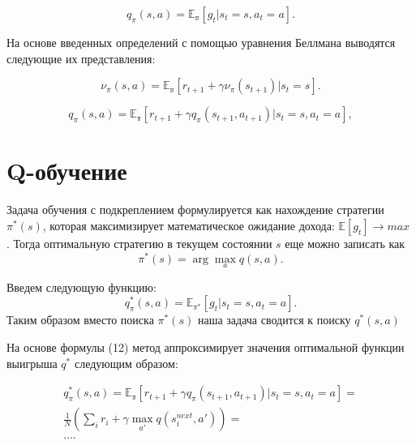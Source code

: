 \begin{equation}
    q_{\pi} (s, a)= \mathbb{E_{\pi}} [g_t | s_t = s, a_t = a].
\end{equation}

На основе введенных определений с помощью уравнения Беллмана выводятся следующие их представления:


\begin{equation}
	\nu_{\pi}(s, a) = \mathbb{E_\pi} [ r_{t+1} + \gamma \nu_\pi(s_{t+1}) | s_t=s].
\end{equation}

\begin{equation}
    q_{\pi}(s, a) = \mathbb{E_\pi} [ r_{t+1} + \gamma q_\pi(s_{t+1}, a_{t+1}) | s_t=s, a_t=a],
\end{equation}


 
\section{Q-обучение}\label{1sec:optimal-control}


Задача обучения с подкреплением формулируется как нахождение стратегии $\pi^*(s)$, которая максимизирует математическое ожидание дохода: $\mathbb{E}[g_t] \to max$ . Тогда оптимальную стратегию в текущем состоянии $s$ еще можно записать как 
\begin{equation}
    \pi^*(s) = \arg \max_a{q(s, a)}.
\end{equation}

Введем следующую функцию:
 $$q^*_{\pi}(s, a) = \mathbb{E}_{\pi^*} [g_t|s_t=s, a_t=a].$$
Таким образом вместо поиска $\pi^*(s)$ наша задача сводится к поиску $q^*(s, a)$


На основе формулы (12) метод аппроксимирует значения оптимальной функции выигрыша $q^*$ следующим образом:

\begin{equation}
	\begin{split}
    q^*_{\pi}(s, a) = \mathbb{E_\pi} [ r_{t+1} + \gamma q_\pi(s_{t+1}, a_{t+1}) | s_t=s, a_t=a] = \\
     \frac{1}{N} \left( \sum\limits_{i} r_i + \gamma \max_{a'} q(s^{next}_i, a') \right) = \\ \dots.
    \end{split}
\end{equation}

